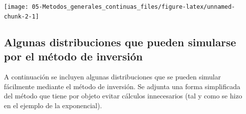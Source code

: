 \documentclass[]{book}
\theoremstyle{definition}
\theoremstyle{definition}
\theoremstyle{definition}
\theoremstyle{remark}
\begin{document}
\begin{center}\texttt{[image: 05-Metodos\_generales\_continuas\_files/figure-latex/unnamed-chunk-2-1]} \end{center}

\subsection{Algunas distribuciones que pueden simularse por el método de
inversión}\label{algunas-distribuciones-que-pueden-simularse-por-el-metodo-de-inversion}

A continuación se incluyen algunas distribuciones que se pueden simular
fácilmente mediante el método de inversión. Se adjunta una forma
simplificada del método que tiene por objeto evitar cálculos
innecesarios (tal y como se hizo en el ejemplo de la exponencial).
\end{document}
